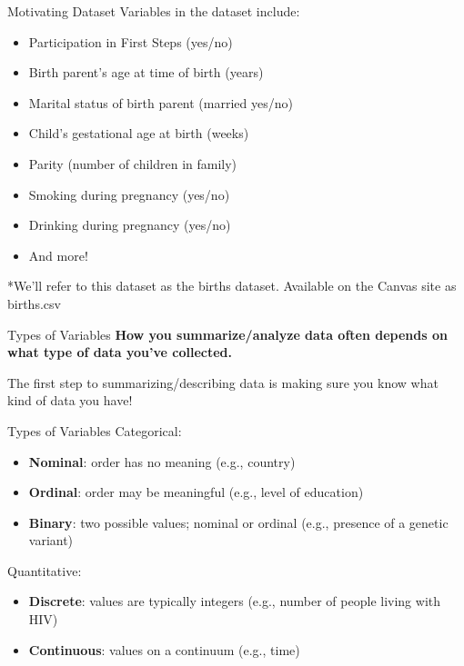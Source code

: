 \documentclass[
  ignorenonframetext,
]{beamer}
\providecommand{\tightlist}{%
  \setlength{\itemsep}{0pt}\setlength{\parskip}{0pt}}
\begin{document}
\begin{frame}{Motivating Dataset}
\protect\hypertarget{motivating-dataset-1}{}
Variables in the dataset include:

\begin{itemize}
\tightlist
\item
  Participation in First Steps (yes/no)
\item
  Birth parent's age at time of birth (years)
\item
  Marital status of birth parent (married yes/no)
\item
  Child's gestational age at birth (weeks)
\item
  Parity (number of children in family)
\item
  Smoking during pregnancy (yes/no)
\item
  Drinking during pregnancy (yes/no)
\item
  And more!
\end{itemize}

*We'll refer to this dataset as the {births} dataset. Available on the
Canvas site as {births.csv}
\end{frame}

\begin{frame}{Types of Variables}
\protect\hypertarget{types-of-variables}{}
\textbf{How you summarize/analyze data often depends on what type of
data you've collected. }

The first step to summarizing/describing data is making sure you know
what kind of data you have!
\end{frame}

\begin{frame}{Types of Variables}
\protect\hypertarget{types-of-variables-1}{}
{Categorical}:

\begin{itemize}
\tightlist
\item
  \textbf{Nominal}: order has no meaning (e.g., country)
\item
  \textbf{Ordinal}: order may be meaningful (e.g., level of education)
\item
  \textbf{Binary}: two possible values; nominal or ordinal (e.g.,
  presence of a genetic variant)
\end{itemize}

{Quantitative}:

\begin{itemize}
\tightlist
\item
  \textbf{Discrete}: values are typically integers (e.g., number of
  people living with HIV)
\item
  \textbf{Continuous}: values on a continuum (e.g., time)
\end{itemize}
\end{frame}
\end{document}
